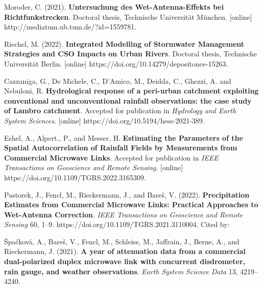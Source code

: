 \documentclass{ctuthesis}\usepackage[]{graphicx}\usepackage[]{color}
\begin{document}
\begin{description}
\begin{description}
                \item Moroder, C. (2021). \textbf{Untersuchung des Wet-Antenna-Effekts bei Richtfunkstrecken}. Doctoral thesis, Technische Universität München. [online] \newline http://mediatum.ub.tum.de/?id=1559781.
                \item Riechel, M. (2022). \textbf{Integrated Modelling of Stormwater Management
Strategies and CSO Impacts on Urban Rivers}. Doctoral thesis, Technische Universität Berlin. [online] \newline https://doi.org/10.14279/depositonce-15263.
                \item Cazzaniga, G., De Michele, C., D'Amico, M., Deidda, C., Ghezzi, A. and Nebuloni, R. \textbf{Hydrological response of a peri-urban catchment exploiting conventional and unconventional rainfall observations: the case study of Lambro catchment}. Accepted for publication in \emph{Hydrology and Earth System Sciences}. [online] \newline https://doi.org/10.5194/hess-2021-389.
                \item Eshel, A., Alpert., P., and Messer, H. \textbf{Estimating the Parameters of the Spatial Autocorrelation of Rainfall Fields by Measurements from Commercial Microwave Links}. Accepted for publication in \emph{IEEE Transactions on Geoscience and Remote Sensing}. [online] \newline https://doi.org/10.1109/TGRS.2022.3165309.
        \end{description}


\item  Pastorek, J., Fencl, M., Rieckermann, J., and Bareš, V. (2022). \textbf{Precipitation Estimates from Commercial Microwave Links: Practical Approaches to Wet-Antenna Correction}. \emph{IEEE Transactions on Geoscience and Remote Sensing} 60, 1--9. https://doi.org/10.1109/TGRS.2021.3110004.
Cited by:
        \begin{description}
                \item Špačková, A., Bareš, V., Fencl, M., Schleiss, M., Jaffrain, J., Berne, A., and Rieckermann, J. (2021). \textbf{A year of attenuation data from a commercial dual-polarized duplex microwave link with concurrent disdrometer, rain gauge, and weather observations}.  \emph{Earth System Science Data} 13, 4219--4240.
        \end{description}
        
\end{description}
\end{document}
